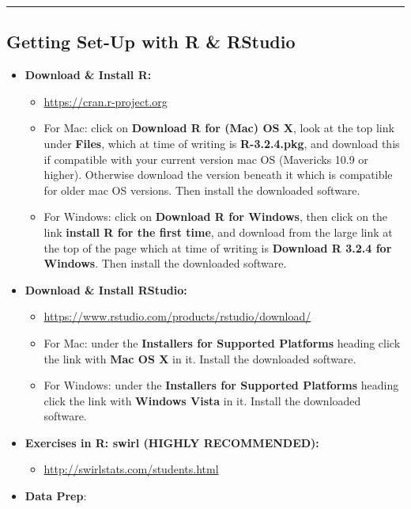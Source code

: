 \documentclass[]{book}
\providecommand{\tightlist}{%
  \setlength{\itemsep}{0pt}\setlength{\parskip}{0pt}}
\begin{document}
\begin{center}\rule{0.5\linewidth}{0.5pt}\end{center}

\hypertarget{getting-set-up-with-r-rstudio}{%
\subsection{Getting Set-Up with R \& RStudio}\label{getting-set-up-with-r-rstudio}}

\begin{itemize}
\tightlist
\item
  \textbf{Download \& Install R:}

  \begin{itemize}
  \tightlist
  \item
    \url{https://cran.r-project.org}
  \item
    For Mac: click on \textbf{Download R for (Mac) OS X}, look at the top link under \textbf{Files}, which at time of writing is \textbf{R-3.2.4.pkg}, and download this if compatible with your current version mac OS (Mavericks 10.9 or higher). Otherwise download the version beneath it which is compatible for older mac OS versions. Then install the downloaded software.
  \item
    For Windows: click on \textbf{Download R for Windows}, then click on the link \textbf{install R for the first time}, and download from the large link at the top of the page which at time of writing is \textbf{Download R 3.2.4 for Windows}. Then install the downloaded software.
  \end{itemize}
\item
  \textbf{Download \& Install RStudio:}

  \begin{itemize}
  \tightlist
  \item
    \url{https://www.rstudio.com/products/rstudio/download/}
  \item
    For Mac: under the \textbf{Installers for Supported Platforms} heading click the link with \textbf{Mac OS X} in it. Install the downloaded software.
  \item
    For Windows: under the \textbf{Installers for Supported Platforms} heading click the link with \textbf{Windows Vista} in it. Install the downloaded software.
  \end{itemize}
\item
  \textbf{Exercises in R: swirl (HIGHLY RECOMMENDED):}

  \begin{itemize}
  \tightlist
  \item
    \url{http://swirlstats.com/students.html}
  \end{itemize}
\item
  \textbf{Data Prep}:


\end{itemize}
\end{document}
